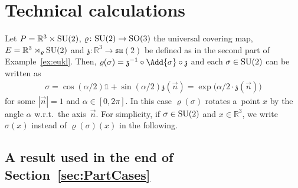 \documentclass[pdftex]{sigma}
\numberwithin{equation}{section}
\begin{document}
\section{Technical calculations}%

Let $P=\mathbb{R}^3\times {\rm SU}(2)$, $\varrho \colon {\rm SU}(2)\rightarrow {\rm SO}(3)$ the universal covering map, $E=\mathbb{R}^3
\rtimes_\varrho {\rm SU}(2)$ and ${\mathfrak{z}}\colon \mathbb{R}^3\rightarrow \mathfrak{su}(2)$ be def\/ined as in the second part of
Example~\ref{ex:eukl}.
Then, $\varrho(\sigma)={\mathfrak{z}}^{-1}\circ\Add{\sigma}\circ {\mathfrak{z}} $ and each $\sigma\in {\rm SU}(2)$ can be written as
\begin{gather*}
\sigma= \cos(\alpha/2)\mathds{1} + \sin(\alpha/2){\mathfrak{z}}(\vec{n})=\exp\big(\alpha/2\cdot{\mathfrak{z}}(\vec{n})\big)
\end{gather*}
for some $|\vec{n}|=1$ and $\alpha\in [0,2\pi]$.
In this case $\varrho(\sigma)$ rotates a~point $x$ by the angle $\alpha$ w.r.t.\ the axis~$\vec{n}$.
For simplicity, if $\sigma\in {\rm SU}(2)$ and $x\in \mathbb{R}^3$, we write $\sigma(x)$ instead of $\varrho(\sigma)(x)$ in
the following.

\subsection{A result used in the end of Section~\ref{sec:PartCases}}\label{subsec:DifferentLifts}
\end{document}
